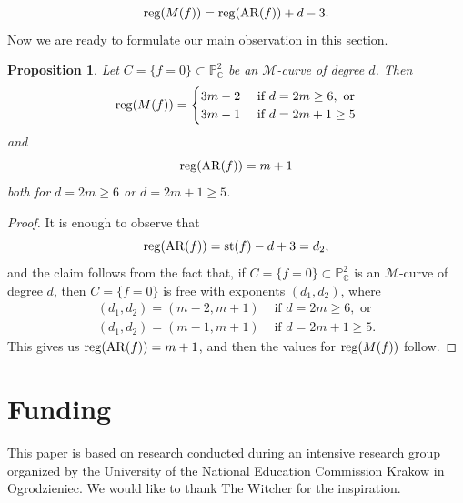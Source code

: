 \documentclass[11pt]{article}
\theoremstyle{plain}
\newtheorem{proposition}[theorem]{Proposition}
\theoremstyle{definition}
\theoremstyle{remark}
\begin{document}
\begin{equation}
{\rm reg}(M(f)) = {\rm reg}({\rm AR}(f))+d-3.
\end{equation}
Now we are ready to formulate our main observation in this section.
\begin{proposition}
Let $C = \{f=0\}\subset \mathbb{P}^{2}_{\mathbb{C}}$ be an $\mathscr{M}$-curve of degree $d$. Then
$${\rm reg}(M(f)) = \begin{cases}
3m-2 & \text{ if } d=2m\geq 6, \text{ or}\\
3m-1 & \text{ if } d=2m+1 \geq 5
\end{cases}$$
and
$${\rm reg}({\rm AR}(f)) = m+1$$
both for $d=2m\geq 6$ or $d=2m+1\geq 5$.
\end{proposition}
\begin{proof}
It is enough to observe that 
$${\rm reg}({\rm AR}(f)) = {\rm st}(f) - d + 3 = d_{2},$$
and the claim follows from the fact that, if $C = \{f=0\} \subset \mathbb{P}^{2}_{\mathbb{C}}$ is an $\mathscr{M}$-curve of degree $d$, then $C = \{f=0\}$ is free with exponents $(d_{1},d_{2})$, where
\begin{align*}
(d_{1},d_{2}) = (m-2, m+1) & \text{ if } d=2m\geq 6, \text{ or} \\
(d_{1},d_{2}) = (m-1, m+1) & \text{ if } d=2m+1\geq 5.
\end{align*}
This gives us ${\rm reg}({\rm AR}(f)) = m+1$, and then the values for ${\rm reg}(M(f))$ follow.
\end{proof}
\section*{Funding}
This paper is based on research conducted during an intensive research group organized by the University of the National Education Commission Krakow in Ogrodzieniec. We would like to thank The Witcher for the inspiration.
\end{document}
